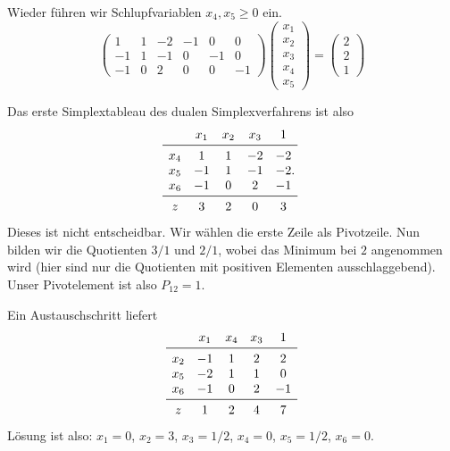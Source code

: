     \begin{solution}
        Wieder führen wir Schlupfvariablen $x_4,x_5\geq 0$ ein.
        $$
        \begin{pmatrix}
            1 & 1 & -2 & -1 & 0 & 0\\
            -1 & 1 & -1 & 0 & -1 & 0\\
            -1 & 0 & 2 & 0 & 0 & -1
        \end{pmatrix}
        \begin{pmatrix}
            x_1\\
            x_2\\
            x_3\\
            x_4\\
            x_5
        \end{pmatrix}
        =
        \begin{pmatrix}
            2\\
            2\\
            1
        \end{pmatrix}
        $$
    
    Das erste Simplextableau des dualen Simplexverfahrens ist also
    $$
    \begin{matrix}
        & x_1 & x_2 & x_3 & 1\\
        \midrule
        x_4 & 1 & 1 & -2 & -2\\
        x_5 & -1 & 1 & -1 & -2\\
        x_6 & -1 & 0 & 2 & -1\\
        \midrule
        z & 3 & 2 & 0 & 3
    \end{matrix}.
    $$
    Dieses ist nicht entscheidbar. Wir wählen die erste Zeile als Pivotzeile.
    Nun bilden wir die Quotienten $3/1$ und $2/1$, wobei das Minimum bei $2$ angenommen wird (hier sind nur die Quotienten mit positiven Elementen ausschlaggebend). Unser Pivotelement ist also $P_{12}=1$.

    Ein Austauschschritt liefert
    $$
    \begin{matrix}
        & x_1 & x_4 & x_3 & 1\\
        \midrule
        x_2 & -1 & 1 & 2 & 2 \\
        x_5 & -2 & 1 & 1 & 0 \\
        x_6 & -1 & 0 & 2 & -1 \\
        \midrule
        z & 1 & 2 & 4 & 7
    \end{matrix}
    $$
    Lösung ist also: $x_1=0$, $x_2=3$, $x_3=1/2$, $x_4=0$, $x_5=1/2$, $x_6=0$.
\end{solution}

